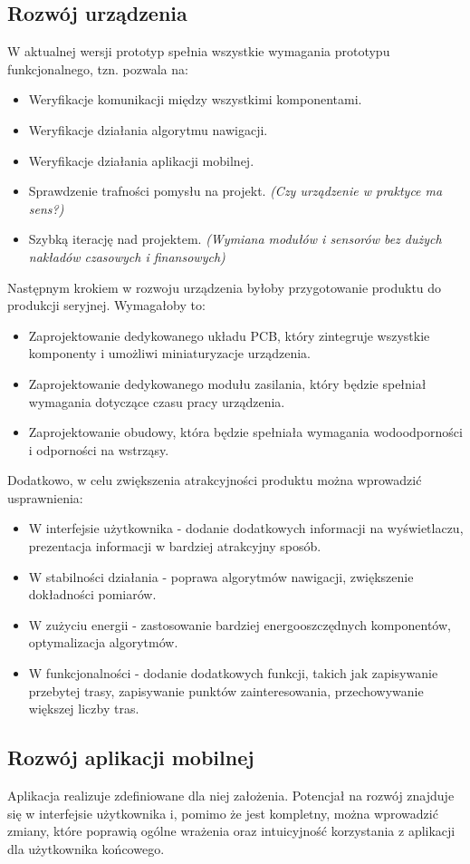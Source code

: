 \subsection{Rozwój urządzenia}
W aktualnej wersji prototyp spełnia wszystkie wymagania prototypu funkcjonalnego, tzn. pozwala na:
\begin{itemize}
    \item Weryfikacje komunikacji między wszystkimi komponentami.
    \item Weryfikacje działania algorytmu nawigacji.
    \item Weryfikacje działania aplikacji mobilnej.
    \item Sprawdzenie trafności pomysłu na projekt. \textit{(Czy urządzenie w praktyce ma sens?)}
    \item Szybką iterację nad projektem. \textit{(Wymiana modułów i sensorów bez dużych nakładów czasowych i finansowych)}
\end{itemize}
Następnym krokiem w rozwoju urządzenia byłoby przygotowanie produktu do produkcji seryjnej. Wymagałoby to:
\begin{itemize}
    \item Zaprojektowanie dedykowanego układu PCB, który zintegruje wszystkie komponenty i umożliwi miniaturyzacje urządzenia.
    \item Zaprojektowanie dedykowanego modułu zasilania, który będzie spełniał wymagania dotyczące czasu pracy urządzenia.
    \item Zaprojektowanie obudowy, która będzie spełniała wymagania wodoodporności i odporności na wstrząsy.
\end{itemize}
Dodatkowo, w celu zwiększenia atrakcyjności produktu można wprowadzić usprawnienia:
\begin{itemize}
    \item W interfejsie użytkownika - dodanie dodatkowych informacji na wyświetlaczu, prezentacja informacji w bardziej atrakcyjny sposób.
    \item W stabilności działania - poprawa algorytmów nawigacji, zwiększenie dokładności pomiarów.
    \item W zużyciu energii - zastosowanie bardziej energooszczędnych komponentów, optymalizacja algorytmów.
    \item W funkcjonalności - dodanie dodatkowych funkcji, takich jak zapisywanie przebytej trasy, zapisywanie punktów zainteresowania, przechowywanie większej liczby tras.
\end{itemize}

\subsection{Rozwój aplikacji mobilnej}
Aplikacja realizuje zdefiniowane dla niej założenia. Potencjał na rozwój znajduje się w interfejsie użytkownika i, pomimo że jest kompletny, można wprowadzić zmiany, które poprawią ogólne wrażenia oraz intuicyjność korzystania z aplikacji dla użytkownika końcowego.